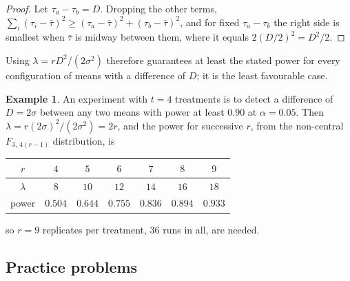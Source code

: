 \documentclass[11pt,a4paper]{article}
\numberwithin{equation}{section}
\theoremstyle{definition}
\newtheorem{exa}[thm]{Example}
\begin{document}
\begin{proof}
Let $\tau_a - \tau_b = D$. Dropping the other terms, $\sum_i(\tau_i - \bar\tau)^2 \ge (\tau_a - \bar\tau)^2 + (\tau_b - \bar\tau)^2$, and for fixed $\tau_a - \tau_b$ the right side is smallest when
$\bar\tau$ is midway between them, where it equals $2(D/2)^2 = D^2/2$.
\end{proof}

Using $\lambda = rD^2/(2\sigma^2)$ therefore guarantees at least the stated power for every configuration of means with a difference of $D$; it is the
least favourable case.

\begin{exa}
An experiment with $t = 4$ treatments is to detect a difference of $D = 2\sigma$ between any two means with power at least $0.90$ at $\alpha = 0.05$. Then
$\lambda = r(2\sigma)^2/(2\sigma^2) = 2r$, and the power for successive $r$, from the non-central $F_{3,\,4(r-1)}$ distribution, is
\begin{center}
\begin{tabular}{c|cccccc}
$r$ & $4$ & $5$ & $6$ & $7$ & $8$ & $9$ \\
\hline
$\lambda$ & $8$ & $10$ & $12$ & $14$ & $16$ & $18$ \\
power & $0.504$ & $0.644$ & $0.755$ & $0.836$ & $0.894$ & $0.933$
\end{tabular}
\end{center}
so $r = 9$ replicates per treatment, $36$ runs in all, are needed.
\end{exa}

\subsection{Practice problems}
\end{document}
